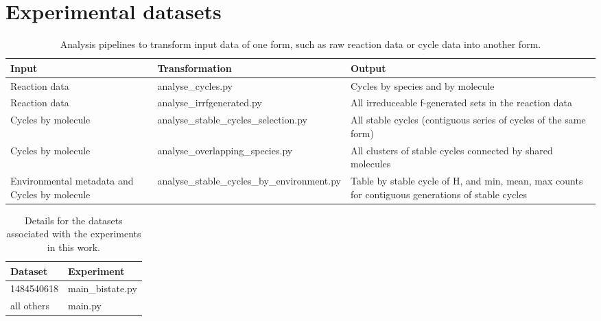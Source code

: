 \chapter{Experimental datasets}\label{datasets}



\begin{table}
	\scriptsize
	\begin{center}
		\caption{Analysis pipelines to transform input data of one form, such as raw reaction data or cycle data into another form.}\label{tbl:datasets}
		\begin{tabular}{p{3cm}p{3cm}p{3cm}}
			\toprule
			Input         	& Transformation		& Output\\
			\midrule
			Reaction data 									& analyse_cycles.py							& Cycles by species and by molecule \\
			Reaction data									& analyse_irrfgenerated.py					& All irreduceable f-generated sets in the reaction data\\
			\midrule
			Cycles by molecule								& analyse_stable_cycles_selection.py		& All stable cycles (contiguous series of cycles of the same form)\\
			Cycles by molecule								& analyse_overlapping_species.py			& All clusters of stable cycles connected by shared molecules\\
			Environmental metadata and Cycles by molecule	& analyse_stable_cycles_by_environment.py	& Table by stable cycle of H, and min, mean, max counts for contiguous generations of stable cycles\\
			\bottomrule
		\end{tabular}
	\end{center}
\end{table}


\begin{table}
	\scriptsize
	\begin{center}
		\caption{Details for the datasets associated with the experiments in this work.}\label{tbl:datasets}
		\begin{tabular}{p{2cm}p{7cm}}
			\toprule
			Dataset         & Experiment\\
			\midrule
			1484540618 		& main_bistate.py \\  %
			all others		& main.py \\  %
			\bottomrule
		\end{tabular}
	\end{center}
\end{table}

